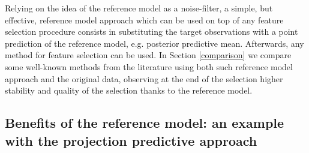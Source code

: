 \documentclass[american,]{article}
\theoremstyle{definition}
\begin{document}

Relying on the idea of the reference model as a noise-filter, a simple, but effective, reference model approach which can be used on top of any feature selection procedure consists in substituting the target observations with a point prediction of the reference model, e.g. posterior predictive mean. Afterwards, any method for feature selection can be used. In Section \ref{comparison} we compare some well-known methods from the literature using both such reference model approach and the original data, observing at the end of the selection higher stability and quality of the selection thanks to the reference model.

\hypertarget{projection}{%
\subsection{Benefits of the reference model: an example with the projection predictive approach}\label{projection}}
\end{document}
